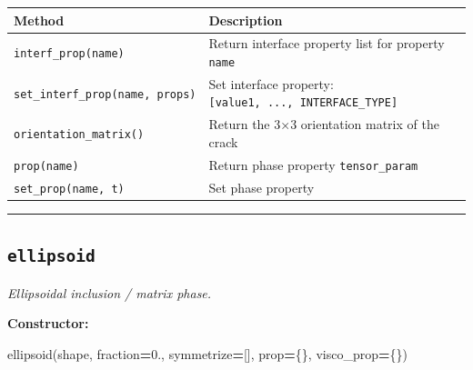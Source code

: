 \documentclass[
  a4paper,
  numbers=noendperiod,
  DIV=12]{scrreprt}
\newenvironment{Shaded}{\begin{snugshade}}{\end{snugshade}}
\newcommand{\FloatTok}[1]{\textcolor[rgb]{0.00,0.00,0.81}{#1}}
\newcommand{\NormalTok}[1]{#1}
\newcommand{\OperatorTok}[1]{\textcolor[rgb]{0.81,0.36,0.00}{\textbf{#1}}}
\newcounter{none} %
\begin{document}
{\def\LTcaptype{none} %
\begin{longtable}[]{@{}
  >{\raggedright\arraybackslash}p{}
  >{\raggedright\arraybackslash}p{}@{}}
\toprule\noalign{}
\begin{minipage}[b]{\linewidth}\raggedright
Method
\end{minipage} & \begin{minipage}[b]{\linewidth}\raggedright
Description
\end{minipage} \\
\midrule\noalign{}
\endhead
\bottomrule\noalign{}
\endlastfoot
\texttt{interf\_prop(name)} & Return interface property list for
property \texttt{name} \\
\texttt{set\_interf\_prop(name,\ props)} & Set interface property:
\texttt{{[}value1,\ ...,\ INTERFACE\_TYPE{]}} \\
\texttt{orientation\_matrix()} & Return the 3×3 orientation matrix of
the crack \\
\texttt{prop(name)} & Return phase property \texttt{tensor\_param} \\
\texttt{set\_prop(name,\ t)} & Set phase property \\
\end{longtable}
}

\begin{center}\rule{0.5\linewidth}{0.5pt}\end{center}

\subsection{\texorpdfstring{\texttt{ellipsoid}}{ellipsoid}}\label{api-ellipsoid}

\emph{Ellipsoidal inclusion / matrix phase.}

\textbf{Constructor:}

\begin{Shaded}
\begin{Highlighting}[]
\NormalTok{ellipsoid(shape, fraction}\OperatorTok{=}\FloatTok{0.}\NormalTok{, symmetrize}\OperatorTok{=}\NormalTok{[], prop}\OperatorTok{=}\NormalTok{\{\}, visco\_prop}\OperatorTok{=}\NormalTok{\{\})}
\end{Highlighting}
\end{Shaded}
\end{document}
